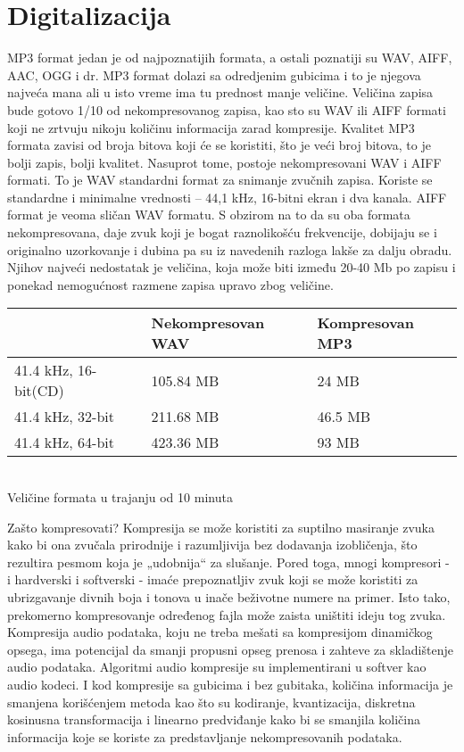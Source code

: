 \documentclass[11pt]{article}
\begin{document}
\section{Digitalizacija}
        MP3 format jedan je od najpoznatijih formata, a ostali poznatiji su WAV, AIFF, AAC,
        OGG i dr. MP3 format dolazi sa odredjenim gubicima i to je njegova najveća mana ali u isto vreme ima tu prednost manje veličine. Veličina zapisa bude gotovo 1/10 od nekompresovanog zapisa, kao sto su WAV ili AIFF formati koji ne zrtvuju nikoju količinu informacija zarad kompresije. Kvalitet
        MP3 formata zavisi od broja bitova koji će se koristiti, što je veći broj bitova, to je bolji zapis,
        bolji kvalitet. Nasuprot tome, postoje nekompresovani WAV i AIFF formati. To je WAV
        standardni format za snimanje zvučnih zapisa. Koriste se standardne i minimalne
        vrednosti – 44,1 kHz, 16-bitni ekran i dva kanala. AIFF format je veoma sličan WAV formatu.
        S obzirom na to da su oba formata nekompresovana, daje zvuk koji je bogat raznolikošću
        frekvencije, dobijaju se i originalno uzorkovanje i dubina pa su iz navedenih razloga
        lakše za dalju obradu. Njihov najveći nedostatak je veličina, koja može biti između 20-40 Mb po
        zapisu i ponekad nemogućnost razmene zapisa upravo zbog veličine.
        
     
  
            \begin{center}
     
        \begin{tabular}{lll} \hline
        & Nekompresovan WAV & Kompresovan MP3 \\ \hline
        41.4 kHz, 16-bit(CD) & 105.84 MB & 24 MB \\ \hline
        41.4 kHz, 32-bit & 211.68 MB & 46.5 MB \\ \hline
        41.4 kHz, 64-bit & 423.36 MB & 93 MB
        \end{tabular} 
            \\Veličine formata u trajanju od 10 minuta
            \end{center}
        
Zašto kompresovati?
Kompresija se može koristiti za suptilno masiranje zvuka kako bi ona zvučala prirodnije i razumljivija bez dodavanja izobličenja, što rezultira pesmom koja je „udobnija“ za slušanje. Pored toga, mnogi kompresori - i hardverski i softverski - imaće prepoznatljiv zvuk koji se može koristiti za ubrizgavanje divnih boja i tonova u inače beživotne numere na primer. Isto tako, prekomerno kompresovanje određenog fajla može zaista uništiti ideju tog zvuka. Kompresija audio podataka, koju ne treba mešati sa kompresijom dinamičkog opsega, ima potencijal da smanji propusni opseg prenosa i zahteve za skladištenje audio podataka. Algoritmi audio kompresije su implementirani u softver kao audio kodeci. I kod kompresije sa gubicima i bez gubitaka, količina informacija je smanjena korišćenjem metoda kao što su kodiranje, kvantizacija, diskretna kosinusna transformacija i linearno predviđanje kako bi se smanjila količina informacija koje se koriste za predstavljanje nekompresovanih podataka.
\end{document}
